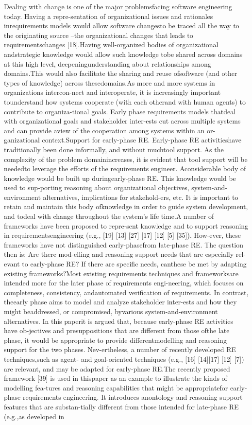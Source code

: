 Dealing with change is one of the major problemsfacing software engineering today. Having a repre-sentation of organizational issues and rationales inrequirements models would allow software changesto be traced all the way to the originating source –the organizational changes that leads to requirementschanges [18].Having well-organized bodies of organizational andstrategic knowledge would allow such knowledge tobe shared across domains at this high level, deepeningunderstanding about relationships among domains.This would also facilitate the sharing and reuse ofsoftware (and other types of knowledge) across thesedomains.As more and more systems in organizations intercon-nect and interoperate, it is increasingly important tounderstand how systems cooperate (with each otherand with human agents) to contribute to organiza-tional goals. Early phase requirements models thatdeal with organizational goals and stakeholder inter-ests cut across multiple systems and can provide aview of the cooperation among systems within an or-ganizational context.Support for early-phase RE. Early-phase RE activitieshave traditionally been done informally, and without muchtool support. As the complexity of the problem domainincreases, it is evident that tool support will be neededto leverage the efforts of the requirements engineer. Aconsiderable body of knowledge would be built up duringearly-phase RE. This knowledge would be used to sup-porting reasoning about organizational objectives, system-and-environment alternatives, implications for stakehold-ers, etc. It is important to retain and maintain this body ofknowledge in order to guide system development, and todeal with change throughout the system’s life time.A number of frameworks have been proposed to repre-sent knowledge and to support reasoning in requirementsengineering (e.g., [19] [13] [27] [17] [12] [5] [35]). How-ever, these frameworks have not distinguished early-phasefrom late-phase RE. The question then is: Are there mod-elling and reasoning support needs that are especially rel-evant to early-phase RE? If there are speciﬁc needs, canthese be met by adapting existing frameworks?Most existing requirements techniques and frameworksare intended more for the later phase of requirements engi-neering, which focuses on completeness, consistency, andautomated veriﬁcation of requirements. In contrast, theearly phase aims to model and analyze stakeholder inter-ests and how they might beaddressed, or compromised, byvarious system-and-environment alternatives. In this paperit is argued that, because early-phase RE activities have ob-jectives and presuppositions that are different from those ofthe late phase, it would be appropriate to provide differentmodelling and reasoning support for the two phases. Nev-ertheless, a number of recently developed RE techniques,such as agent- and goal-oriented techniques (e.g., [16] [14][17] [12] [7]) are relevant, and may be adapted for early-phase RE.The recently proposed framework [39] is used in thispaper as an example to illustrate the kinds of modelling fea-tures and reasoning capabilities that might be appropriatefor early-phase requirements engineering. It introduces anontology and reasoning support features that are substan-tially different from those intended for late-phase RE (e.g.,as developed in 